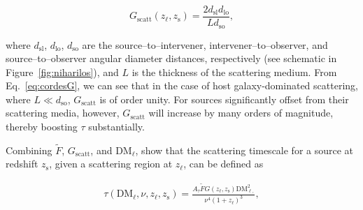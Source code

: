 \documentclass[twocolumn, linenumbers, tra]{aastex631}
\begin{document}
\begin{equation} \label{eq:cordesG}
  G_{\mathrm{scatt}} \left(z_{\ell}, z_{\mathrm{s}}\right) = \frac{2 d_{\mathrm{sl}} d_{\mathrm{lo}}}{L d_{\mathrm{so}}},
\end{equation}

\noindent
where $d_{\mathrm{sl}}$, $d_{\mathrm{lo}}$, $d_{\mathrm{so}}$ are the source--to--intervener, intervener--to--observer, and source--to--observer angular diameter distances, respectively (see schematic in Figure\ \ref{fig:niharilos}), and $L$ is the thickness of the scattering medium. From Eq.~\ref{eq:cordesG}, we can see that in the case of host galaxy-dominated scattering, where $L \ll d_{\mathrm{so}}$, $G_{\mathrm{scatt}}$ is of order unity. For sources significantly offset from their scattering media, however, $G_{\mathrm{scatt}}$ will increase by many orders of magnitude, thereby boosting $\tau$ substantially.

Combining $\widetilde{F}$, $G_{\mathrm{scatt}}$, and $\mathrm{DM}_{\ell}$, \citet{Cordes2022} show that the scattering timescale for a source at redshift $z_{\mathrm{s}}$, given a scattering region at $z_{\ell}$, can be defined as

\begin{equation} \label{eq:cordesscat}
\begin{aligned}
\tau\left(\mathrm{DM}_{\ell}, \nu, z_{\ell}, z_{\mathrm{s}}\right) = \frac{A_\tau \widetilde{F} G\left(z_{\ell}, z_{\mathrm{s}}\right) \mathrm{DM}_{\ell,}^2}{\nu^4\left(1+z_{\ell}\right)^3} ,
\end{aligned}
\end{equation}
\end{document}
